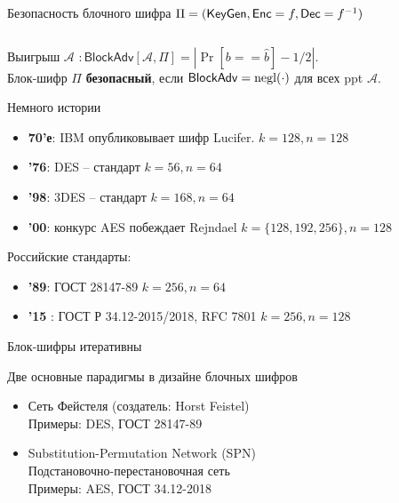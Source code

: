 \documentclass[usenames,dvipsnames,8pt,aspectratio=169]{beamer}
\begin{document}
\begin{frame}{Безопасность блочного шифра $\Pi = (\textsf{KeyGen}, \textsf{Enc} = f, \textsf{Dec} = f^{-1})$}
\begin{columns}
\begin{column}{0.5\textwidth}
		\end{column}
	\end{columns}
	 
	 \vspace{15pt}
	 \large 
	
	 Выигрыш $\mathcal{A}$ $:	\mathsf{BlockAdv} \left[  \mathcal{A}, \Pi\right ] = |\Pr[b == \hat{b}] - 1/2|$. \\[6pt]
	 Блок-шифр $\Pi$ {\color{Orange}\textbf{безопасный}}, если $	\mathsf{BlockAdv} = \mathrm{negl}(\cdot)$ для всех ppt $\mathcal{A}$.
\end{frame}

\begin{frame}{Немного истории}
\Large
\begin{itemize}
	
	\itemsep1em
	\item {\color{Orange}\textbf{70'е}:} IBM опубликовывает шифр Lucifer. $k=128, n = 128$ 
	\item {\color{Orange}\textbf{'76}:} DES -- стандарт $k=56, n = 64$
	\item {\color{Orange}\textbf{'98}:} 3DES -- стандарт  $k=168, n = 64$
	\item {\color{Orange}\textbf{'00}:} конкурс AES побеждает Rejndael $k=\{128, 192, 256\}, n = 128$
\end{itemize}

\vspace{10pt}
Российские стандарты:\\

\begin{itemize}
	
	\itemsep1em
	\item {\color{Orange}\textbf{'89}:} ГОСТ 28147-89 $k=256, n = 64$ 
	\item {\color{Orange}\textbf{'15 }:} ГОСТ Р 34.12-2015/2018, RFC 7801 $k=256, n = 128$ 
\end{itemize}


\end{frame}

\begin{frame}{Блок-шифры итеративны}


\end{frame}

\begin{frame}{Две основные парадигмы в дизайне блочных шифров}

\begin{itemize}
	\itemsep 2em
	\LARGE
	\item Сеть Фейстеля (создатель: Horst Feistel)
	\\[5pt]
	
	\Large
	Примеры: DES, ГОСТ 28147-89
	\LARGE
	\item Substitution-Permutation Network (SPN) \\ Подстановочно-перестановочная сеть  \\[5pt]
	\Large
	Примеры: AES, ГОСТ 34.12-2018
	
\end{itemize}
\end{frame}
\end{document}
